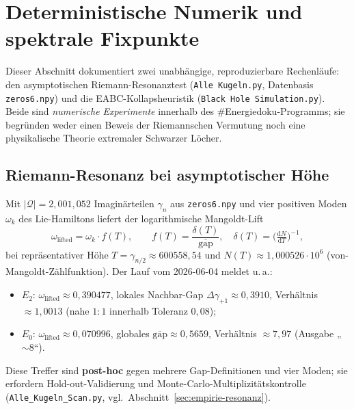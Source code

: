 
\section{Deterministische Numerik und spektrale Fixpunkte}\label{sec:determ-numerik-fixpunkte}

Dieser Abschnitt dokumentiert zwei unabhängige, reproduzierbare Rechenläufe: den asymptotischen Riemann-Resonanztest (\texttt{Alle Kugeln.py}, Datenbasis \texttt{zeros6.npy}) und die EABC-Kollapsheuristik (\texttt{Black Hole Simulation.py}). Beide sind \emph{numerische Experimente} innerhalb des \#Energiedoku-Programms; sie begründen weder einen Beweis der Riemannschen Vermutung noch eine physikalische Theorie extremaler Schwarzer Löcher.

\subsection{Riemann-Resonanz bei asymptotischer Höhe}

Mit $|\mathcal{Q}| = 2{,}001{,}052$ Imaginärteilen $\gamma_n$ aus \texttt{zeros6.npy} und vier positiven Moden $\omega_k$ des Lie-Hamiltons liefert der logarithmische Mangoldt-Lift
\[
  \omega_{\mathrm{lifted}} = \omega_k \cdot f(T), \qquad
  f(T) = \frac{\delta(T)}{\overline{\mathrm{gap}}}, \quad
  \delta(T) = \bigl(\tfrac{\mathrm{d}N}{\mathrm{d}T}\bigr)^{-1},
\]
bei repräsentativer Höhe $T = \gamma_{n/2} \approx 600558{,}54$ und $N(T) \approx 1{,}000526 \cdot 10^6$ (von-Mangoldt-Zählfunktion). Der Lauf vom 2026-06-04 meldet u.\,a.:
\begin{itemize}
  \item $E_2$: $\omega_{\mathrm{lifted}} \approx 0{,}390477$, lokales Nachbar-Gap $\Delta\gamma_{+1} \approx 0{,}3910$, Verhältnis $\approx 1{,}0013$ (nahe $1:1$ innerhalb Toleranz $0{,}08$);
  \item $E_0$: $\omega_{\mathrm{lifted}} \approx 0{,}070996$, globales $\overline{\mathrm{gap}} \approx 0{,}5659$, Verhältnis $\approx 7{,}97$ (Ausgabe „$\sim 8$“).
\end{itemize}
Diese Treffer sind \textbf{post-hoc} gegen mehrere Gap-Definitionen und vier Moden; sie erfordern Hold-out-Validierung und Monte-Carlo-Multiplizitätskontrolle (\texttt{Alle\_Kugeln\_Scan.py}, vgl.\ Abschnitt~\ref{sec:empirie-resonanz}).

